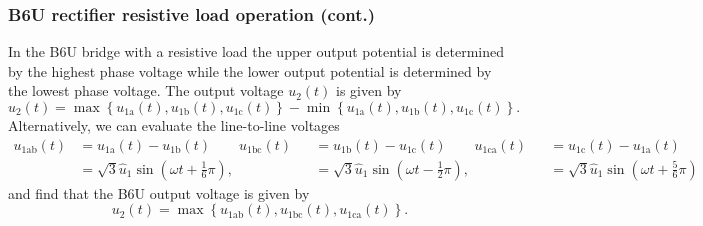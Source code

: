 \begin{frame}
    \frametitle{B6U rectifier resistive load operation (cont.)}
    In the B6U bridge with a resistive load the upper output potential is determined by the highest phase voltage while the lower output potential is determined by the lowest phase voltage. The output voltage $u_2(t)$ is given by
    \begin{equation}
        u_2(t) = \max\left\{u_{1\mathrm{a}}(t), u_{1\mathrm{b}}(t), u_{1\mathrm{c}}(t)\right\} - \min\left\{u_{1\mathrm{a}}(t), u_{1\mathrm{b}}(t), u_{1\mathrm{c}}(t)\right\}.
    \end{equation}
    Alternatively, we can evaluate the line-to-line voltages
    \begin{equation*}
        \begin{alignedat}{3}
        u_{1\mathrm{ab}}(t) &= u_{1\mathrm{a}}(t) - u_{1\mathrm{b}}(t) \qquad u_{1\mathrm{bc}}(t) &&= u_{1\mathrm{b}}(t) - u_{1\mathrm{c}}(t) \qquad u_{1\mathrm{ca}}(t) &&= u_{1\mathrm{c}}(t) - u_{1\mathrm{a}}(t)\\
                            &=\sqrt{3}\hat{u}_1\sin(\omega t + \frac{1}{6}\pi), &&= \sqrt{3}\hat{u}_1\sin(\omega t - \frac{1}{2}\pi), &&= \sqrt{3}\hat{u}_1\sin(\omega t + \frac{5}{6}\pi)
        \end{alignedat}
    \end{equation*}
    and find that the B6U output voltage is given by
    \begin{equation}
        u_2(t) = \max\left\{u_{1\mathrm{ab}}(t), u_{1\mathrm{bc}}(t), u_{1\mathrm{ca}}(t)\right\}.
    \end{equation} 
\end{frame}

